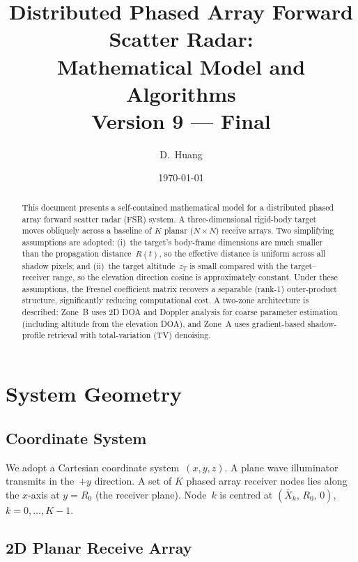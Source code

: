 \documentclass[11pt,a4paper]{article}
\title{Distributed Phased Array Forward Scatter Radar:\\
Mathematical Model and Algorithms\\[6pt]
\large Version 9 --- Final}
\author{D.~Huang}
\date{\today}
\begin{document}
\maketitle

\begin{abstract}
This document presents a self-contained mathematical model for a
distributed phased array forward scatter radar (FSR) system.  A
three-dimensional rigid-body target moves obliquely across a baseline
of $K$ planar ($N\times N$) receive arrays.  Two simplifying
assumptions are adopted: (i)~the target's body-frame dimensions are
much smaller than the propagation distance~$R(t)$, so the effective
distance is uniform across all shadow pixels; and (ii)~the target
altitude~$z_T$ is small compared with the target--receiver range, so
the elevation direction cosine is approximately constant.  Under
these assumptions, the Fresnel coefficient matrix recovers a
separable (rank-1) outer-product structure, significantly reducing
computational cost.  A two-zone architecture is described: Zone~B
uses 2D DOA and Doppler analysis for coarse parameter estimation
(including altitude from the elevation DOA), and Zone~A uses
gradient-based shadow-profile retrieval with total-variation (TV)
denoising.
\end{abstract}

\tableofcontents
\newpage

\section{System Geometry}
\label{sec:geometry}

\subsection{Coordinate System}

We adopt a Cartesian coordinate system~$(x,y,z)$.  A plane wave
illuminator transmits in the~$+y$ direction.  A set of $K$ phased
array receiver nodes lies along the $x$-axis at $y=R_0$ (the
receiver plane).  Node~$k$ is centred at
$(\bar{X}_k,\,R_0,\,0)$, $k=0,\ldots,K{-}1$.

\subsection{2D Planar Receive Array}
\label{sec:2d_array}
\end{document}
